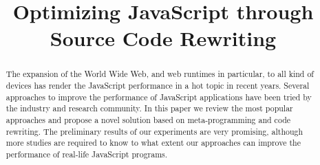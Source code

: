 \documentclass[preprint,10pt]{sigplanconf}
\begin{document}
\setlength{\pdfpageheight}{\paperheight}
\setlength{\pdfpagewidth}{\paperwidth}





\titlebanner{}        %

\title{Optimizing JavaScript through Source Code Rewriting}



            {}
            {}

\maketitle

\begin{abstract}
The expansion of the World Wide Web, and web runtimes in particular, to all kind of devices has render the JavaScript performance in a hot topic in recent years. Several approaches to improve the performance of JavaScript applications have been tried by the industry and research community. In this paper we review the most popular approaches and propose a novel solution based on meta-programming and code rewriting. The preliminary results of our experiments are very promising, although more studies are required to know to what extent our approaches can improve the performance of real-life JavaScript programs.
\end{abstract}
\end{document}
